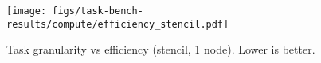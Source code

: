 \begin{figure}[t]
\centering
\texttt{[image: figs/task-bench-results/compute/efficiency\_stencil.pdf]}
\vspace{-0.5cm}
\caption{Task granularity vs efficiency (stencil, 1 node). Lower is better.\label{fig:efficiency}}
\vspace{-0.05cm}
\end{figure}
